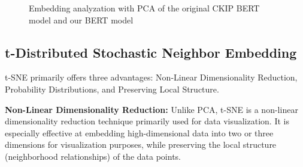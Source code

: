 \documentclass[PhD]{PHlab-thesis}
\begin{document}
\begin{figure}[h!]
  \centering
  \hfill
  \captionsetup{type=figure}
  \caption{Embedding analyzation with PCA of the original CKIP BERT model and our BERT model}
  \label{fig:naver dictionary}
\end{figure}

\subsection{t-Distributed Stochastic Neighbor Embedding}
t-SNE primarily offers three advantages: Non-Linear Dimensionality Reduction, Probability Distributions, and Preserving Local Structure.

\textbf{Non-Linear Dimensionality Reduction:} Unlike PCA, t-SNE is a non-linear dimensionality reduction technique primarily used for data visualization. It is especially effective at embedding high-dimensional data into two or three dimensions for visualization purposes, while preserving the local structure (neighborhood relationships) of the data points.
\end{document}
